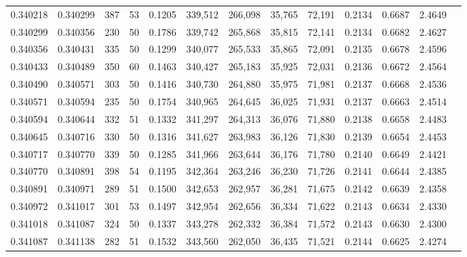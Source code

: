 \begin{tabular}{rrrrrrrrrrrrr}
0.340218 & 0.340299 &   387 &  53 &                                     0.1205 & 339,512 & 266,098 &  35,765 &  72,191 & 0.2134 & 0.6687 & 2.4649 \\
0.340299 & 0.340356 &   230 &  50 &                                     0.1786 & 339,742 & 265,868 &  35,815 &  72,141 & 0.2134 & 0.6682 & 2.4627 \\
0.340356 & 0.340431 &   335 &  50 &                                     0.1299 & 340,077 & 265,533 &  35,865 &  72,091 & 0.2135 & 0.6678 & 2.4596 \\
0.340433 & 0.340489 &   350 &  60 &                                     0.1463 & 340,427 & 265,183 &  35,925 &  72,031 & 0.2136 & 0.6672 & 2.4564 \\
0.340490 & 0.340571 &   303 &  50 &                                     0.1416 & 340,730 & 264,880 &  35,975 &  71,981 & 0.2137 & 0.6668 & 2.4536 \\
0.340571 & 0.340594 &   235 &  50 &                                     0.1754 & 340,965 & 264,645 &  36,025 &  71,931 & 0.2137 & 0.6663 & 2.4514 \\
0.340594 & 0.340644 &   332 &  51 &                                     0.1332 & 341,297 & 264,313 &  36,076 &  71,880 & 0.2138 & 0.6658 & 2.4483 \\
0.340645 & 0.340716 &   330 &  50 &                                     0.1316 & 341,627 & 263,983 &  36,126 &  71,830 & 0.2139 & 0.6654 & 2.4453 \\
0.340717 & 0.340770 &   339 &  50 &                                     0.1285 & 341,966 & 263,644 &  36,176 &  71,780 & 0.2140 & 0.6649 & 2.4421 \\
0.340770 & 0.340891 &   398 &  54 &                                     0.1195 & 342,364 & 263,246 &  36,230 &  71,726 & 0.2141 & 0.6644 & 2.4385 \\
0.340891 & 0.340971 &   289 &  51 &                                     0.1500 & 342,653 & 262,957 &  36,281 &  71,675 & 0.2142 & 0.6639 & 2.4358 \\
0.340972 & 0.341017 &   301 &  53 &                                     0.1497 & 342,954 & 262,656 &  36,334 &  71,622 & 0.2143 & 0.6634 & 2.4330 \\
0.341018 & 0.341087 &   324 &  50 &                                     0.1337 & 343,278 & 262,332 &  36,384 &  71,572 & 0.2143 & 0.6630 & 2.4300 \\
0.341087 & 0.341138 &   282 &  51 &                                     0.1532 & 343,560 & 262,050 &  36,435 &  71,521 & 0.2144 & 0.6625 & 2.4274 \\

\end{tabular}
